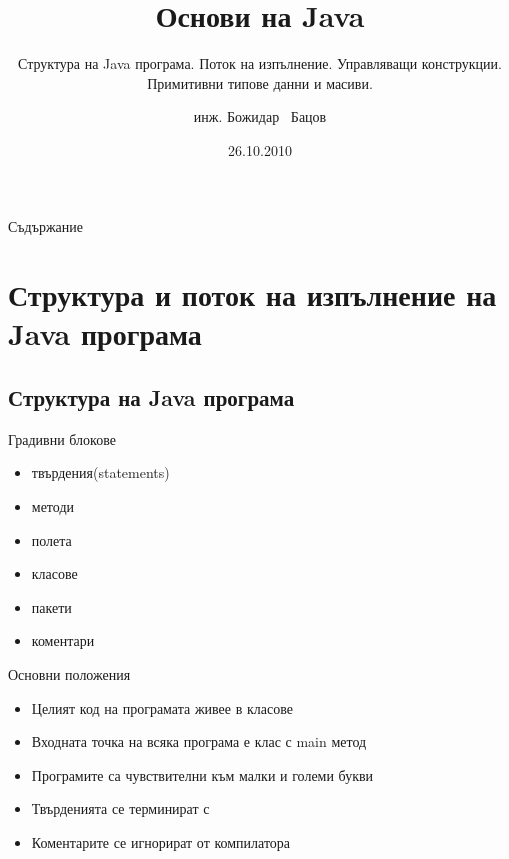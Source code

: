 \documentclass{beamer}
\title{Основи на Java}
\subtitle
{Структура на Java програма. Поток на изпълнение. Управляващи
  конструкции. Примитивни типове данни и масиви.}
\author[инж. Божидар Бацов]{инж. Божидар ~Бацов}
\institute{Drow Ltd.}
\date{26.10.2010}
\begin{document}

\begin{frame}
  \titlepage
\end{frame}

\begin{frame}{Съдържание}
  \tableofcontents
\end{frame}




\section{Структура и поток на изпълнение на Java програма}

\subsection{Структура на Java програма}

\begin{frame}{Градивни блокове}
  \begin{itemize}
  \item твърдения(statements)
  \item методи
  \item полета
  \item класове
  \item пакети
  \item коментари
  \end{itemize}
\end{frame}


\begin{frame}{Основни положения}  
  \begin{itemize}
    \item Целият код на програмата живее в класове
    \item Входната точка на всяка програма е клас с main метод
    \item Програмите са чувствителни към малки и големи букви
    \item Твърденията се терминират с
    \item Коментарите се игнорират от компилатора
  \end{itemize}
\end{frame}
\end{document}

